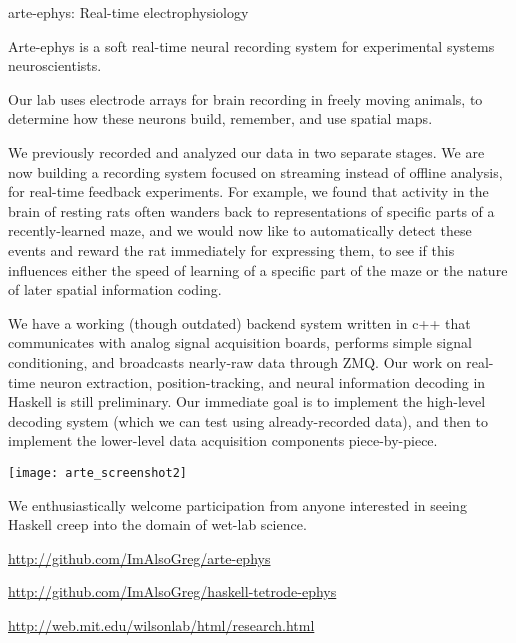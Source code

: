 \documentclass[DIV16,twocolumn,10pt]{scrreprt}
\begin{document}
\begin{hcarentry}{arte-ephys: Real-time electrophysiology}
\makeheader

Arte-ephys is a soft real-time neural recording system for experimental systems neuroscientists.

Our lab uses electrode arrays for brain recording in freely moving animals, to determine how these neurons build, remember, and use spatial maps.

We previously recorded and analyzed our data in two separate stages.  We are now building a recording system focused on streaming instead of offline analysis, for real-time feedback experiments.  For example, we found that activity in the brain of resting rats often wanders back to representations of specific parts of a recently-learned maze, and we would now like to automatically detect these events and reward the rat immediately for expressing them, to see if this influences either the speed of learning of a specific part of the maze or the nature of later spatial information coding.

We have a working (though outdated) backend system written in c++ that communicates with analog signal acquisition boards, performs simple signal conditioning, and broadcasts nearly-raw data through ZMQ.  Our work on real-time neuron extraction, position-tracking, and neural information decoding in Haskell is still preliminary.  Our immediate goal is to implement the high-level decoding system (which we can test using already-recorded data), and then to implement the lower-level data acquisition components piece-by-piece.

\texttt{[image: arte\_screenshot2]}


We enthusiastically welcome participation from anyone interested in seeing Haskell creep into the domain of wet-lab science.

\FurtherReading
\begin{compactitem}
\item \url{http://github.com/ImAlsoGreg/arte-ephys}
\item \url{http://github.com/ImAlsoGreg/haskell-tetrode-ephys}
\item \url{http://web.mit.edu/wilsonlab/html/research.html}
\end{compactitem}
\end{hcarentry}
\end{document}
